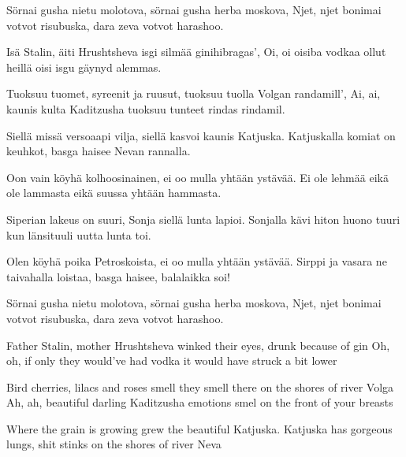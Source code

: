 \medskip

\begin{paracol}{2}
\small

\begin{guitar}
	Sörnai gusha nietu molotova,
	sörnai gusha herba moskova,
	\ltrepeat Njet, njet bonimai votvot risubuska,
	dara zeva votvot harashoo. \rtrepeat

	Isä Stalin, äiti Hrushtsheva
	isgi silmää ginihibragas’,
	\ltrepeat Oi, oi oisiba vodkaa ollut heillä
	oisi isgu gäynyd alemmas. \rtrepeat

	Tuoksuu tuomet, syreenit ja ruusut,
	tuoksuu tuolla Volgan randamill’,
	\ltrepeat Ai, ai, kaunis kulta Kaditzusha
	tuoksuu tunteet rindas rindamil. \rtrepeat

	Siellä missä versoaapi vilja,
	siellä kasvoi kaunis Katjuska.
	\ltrepeat Katjuskalla komiat on keuhkot,
	basga haisee Nevan rannalla. \rtrepeat

	Oon vain köyhä kolhoosinainen,
	ei oo mulla yhtään ystävää.
	\ltrepeat Ei ole lehmää eikä ole lammasta
	eikä suussa yhtään hammasta. \rtrepeat

	Siperian lakeus on suuri,
	Sonja siellä lunta lapioi.
	\ltrepeat Sonjalla kävi hiton huono tuuri kun
	länsituuli uutta lunta toi. \rtrepeat

	Olen köyhä poika Petroskoista,
	ei oo mulla yhtään ystävää.
	\ltrepeat Sirppi ja vasara ne taivahalla loistaa,
	basga haisee, balalaikka soi! \rtrepeat
\end{guitar}

\switchcolumn

\begin{guitar}
	Sörnai gusha nietu molotova,
	sörnai gusha herba moskova,
	Njet, njet bonimai votvot risubuska,
	dara zeva votvot harashoo.

	Father Stalin, mother Hrushtsheva
	winked their eyes, drunk because of gin
	Oh, oh, if only they would've had vodka
	it would have struck a bit lower

	Bird cherries, lilacs and roses smell
	they smell there on the shores of river Volga
	Ah, ah, beautiful darling Kaditzusha
	emotions smel on the front of your breasts

	Where the grain is growing
	grew the beautiful Katjuska.
	Katjuska has gorgeous lungs,
	shit stinks on the shores of river Neva


\end{guitar}
\end{paracol}
